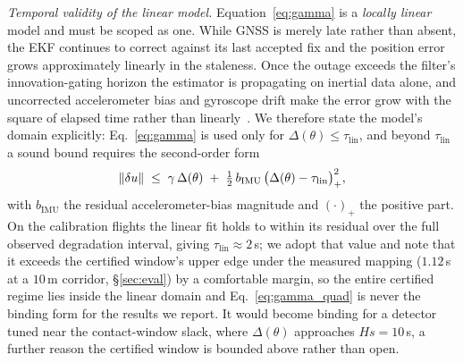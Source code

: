 \emph{Temporal validity of the linear model.} Equation~\eqref{eq:gamma} is a
\emph{locally linear} model and must be scoped as one. While GNSS is merely
late rather than absent, the EKF continues to correct against its last accepted
fix and the position error grows approximately linearly in the staleness. Once
the outage exceeds the filter's innovation-gating horizon the estimator is
propagating on inertial data alone, and uncorrected accelerometer bias and
gyroscope drift make the error grow with the square of elapsed time rather than
linearly~\cite{kong2024px4ekf}. We therefore state the model's domain
explicitly: Eq.~\eqref{eq:gamma} is used only for
$\Delta(\theta)\le\tau_{\mathrm{lin}}$, and beyond $\tau_{\mathrm{lin}}$ a
sound bound requires the second-order form
\begin{equation}
\label{eq:gamma_quad}
\left\lVert \delta u\right\rVert\;\le\;\gamma\,\Delta(\theta)\;+\;\tfrac12\,b_{\mathrm{IMU}}\,\big(\Delta(\theta)-\tau_{\mathrm{lin}}\big)_{+}^{2},
\end{equation}
with $b_{\mathrm{IMU}}$ the residual accelerometer-bias magnitude and
$(\cdot)_+$ the positive part. On the calibration flights the linear fit holds
to within its residual over the full observed degradation interval, giving
$\tau_{\mathrm{lin}}\approx2$\,s; we adopt that value and note that it
exceeds the certified window's upper edge under the measured mapping
($1.12$\,s at a $10$\,m corridor, \S\ref{sec:eval}) by a comfortable margin,
so the entire certified regime lies inside the linear domain and
Eq.~\eqref{eq:gamma_quad} is never the binding form for the results we report. It
would become binding for a detector tuned near the contact-window slack, where
$\Delta(\theta)$ approaches $Hs=10$\,s, a further reason the certified window
is bounded above rather than open.

\begin{table}[t]
\centering
\caption{The measured delay-to-position rate $\gamma$, from three real PX4
flights (one benign reference, one GPS-jamming, one GPS-spoofing) in the
, self-referenced to the pre-attack median. ``noise''
is the pre-attack position-error $95$th percentile; $\gamma_{\mathrm{lsq}}$ and
$\gamma_{\mathrm{peak}}$ are the least-squares and peak-secant growth rates
after attack onset. These are the  pairings.}
\label{tab:whelan}
\scriptsize
\renewcommand{\arraystretch}{1.1}

\end{table}

